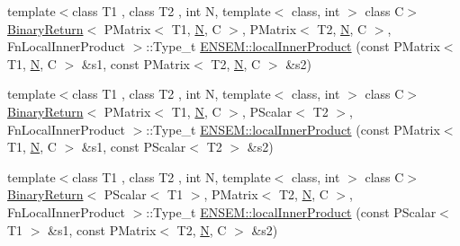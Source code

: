 \begin{DoxyCompactItemize}
\item 
{\footnotesize template$<$class T1 , class T2 , int N, template$<$ class, int $>$ class C$>$ }\\\mbox{\hyperlink{structBinaryReturn}{Binary\+Return}}$<$ P\+Matrix$<$ T1, \mbox{\hyperlink{adat__devel_2lib_2hadron_2operator__name__util_8cc_a7722c8ecbb62d99aee7ce68b1752f337}{N}}, C $>$, P\+Matrix$<$ T2, \mbox{\hyperlink{adat__devel_2lib_2hadron_2operator__name__util_8cc_a7722c8ecbb62d99aee7ce68b1752f337}{N}}, C $>$, Fn\+Local\+Inner\+Product $>$\+::Type\+\_\+t \mbox{\hyperlink{group__primmatrix_ga8ba784b1249c948dcff5b8fe086e2eb5}{E\+N\+S\+E\+M\+::local\+Inner\+Product}} (const P\+Matrix$<$ T1, \mbox{\hyperlink{adat__devel_2lib_2hadron_2operator__name__util_8cc_a7722c8ecbb62d99aee7ce68b1752f337}{N}}, C $>$ \&s1, const P\+Matrix$<$ T2, \mbox{\hyperlink{adat__devel_2lib_2hadron_2operator__name__util_8cc_a7722c8ecbb62d99aee7ce68b1752f337}{N}}, C $>$ \&s2)
\item 
{\footnotesize template$<$class T1 , class T2 , int N, template$<$ class, int $>$ class C$>$ }\\\mbox{\hyperlink{structBinaryReturn}{Binary\+Return}}$<$ P\+Matrix$<$ T1, \mbox{\hyperlink{adat__devel_2lib_2hadron_2operator__name__util_8cc_a7722c8ecbb62d99aee7ce68b1752f337}{N}}, C $>$, P\+Scalar$<$ T2 $>$, Fn\+Local\+Inner\+Product $>$\+::Type\+\_\+t \mbox{\hyperlink{group__primmatrix_gafc7ce30ddacb0b13e2db237cfa268161}{E\+N\+S\+E\+M\+::local\+Inner\+Product}} (const P\+Matrix$<$ T1, \mbox{\hyperlink{adat__devel_2lib_2hadron_2operator__name__util_8cc_a7722c8ecbb62d99aee7ce68b1752f337}{N}}, C $>$ \&s1, const P\+Scalar$<$ T2 $>$ \&s2)
\item 
{\footnotesize template$<$class T1 , class T2 , int N, template$<$ class, int $>$ class C$>$ }\\\mbox{\hyperlink{structBinaryReturn}{Binary\+Return}}$<$ P\+Scalar$<$ T1 $>$, P\+Matrix$<$ T2, \mbox{\hyperlink{adat__devel_2lib_2hadron_2operator__name__util_8cc_a7722c8ecbb62d99aee7ce68b1752f337}{N}}, C $>$, Fn\+Local\+Inner\+Product $>$\+::Type\+\_\+t \mbox{\hyperlink{group__primmatrix_gaaa8729c59af4a03489be7e620e3dd187}{E\+N\+S\+E\+M\+::local\+Inner\+Product}} (const P\+Scalar$<$ T1 $>$ \&s1, const P\+Matrix$<$ T2, \mbox{\hyperlink{adat__devel_2lib_2hadron_2operator__name__util_8cc_a7722c8ecbb62d99aee7ce68b1752f337}{N}}, C $>$ \&s2)
\item 

\end{DoxyCompactItemize}
